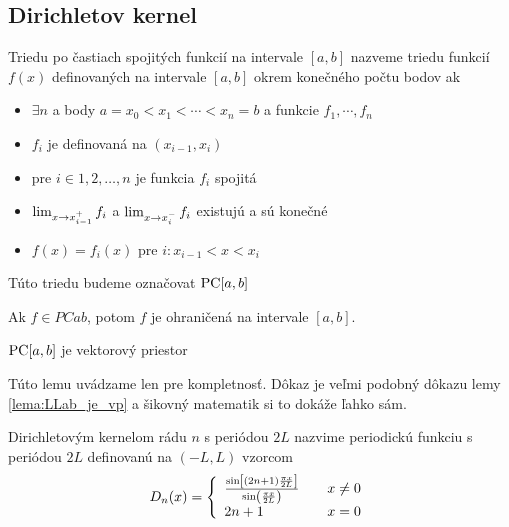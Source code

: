 
\subsection{Dirichletov kernel}
\begin{definicia}
    Triedu po častiach spojitých funkcií na intervale $[a,b]$ nazveme
    triedu funkcií $f(x)$ definovaných na intervale $[a,b]$ okrem
    konečného počtu bodov ak
    \begin{itemize}
        \item
            $\exists n$ a body $a=x_0<x_1<\cdots<x_n=b$ a funkcie
            $f_1, \cdots, f_n$
        \item
            $f_i$ je definovaná na $(x_{i-1},x_i)$
        \item
            pre $i \in 1,2,\dots,n$ je funkcia $f_i$ spojitá
        \item
            $\lim_{x \rightarrow x_{i-1}^+} f_i$ a 
            $\lim_{x \rightarrow x_i^-} f_i$ existujú a sú konečné
        \item
            $f(x) = f_i(x)$ pre $i: x_{i-1} < x < x_i$
    \end{itemize}
    Túto triedu budeme označovat $\mbox{PC}[a,b]$
\end{definicia}

\begin{lema}
    Ak $f \in PCab$, potom $f$ je ohraničená na intervale $[a,b]$.
    \label{lema:ohranicenost_na_pcab}
\end{lema}

\begin{lema}
    $\mbox{PC}[a,b]$ je vektorový priestor
\end{lema}
\begin{dokaz}
    Túto lemu uvádzame len pre kompletnosť. Dôkaz je veľmi podobný
    dôkazu lemy \ref{lema:LLab_je_vp} a šikovný matematik si to dokáže
    ľahko sám.
\end{dokaz}

\begin{definicia}
Dirichletovým kernelom  rádu $n$ s periódou $2L$ nazvime periodickú funkciu
s periódou $2L$ definovanú na $(-L,L)$ vzorcom
\begin{equation}
    D_n(x) = \left\{
        \begin{array}{l l}
            \frac{\sin\left[(2n+1) \frac{\pi x}{2 L}\right]}{
            \sin\left(\frac{\pi x}{2 L}\right)} \quad& x\not=0 \\
            2n+1 \quad& x=0
        \end{array}
    \right.
\end{equation}
\end{definicia}

